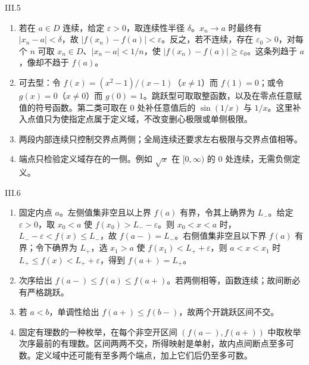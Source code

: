\begin{solution}{III.5}
\begin{enumerate}
 \item 若在 \(a\in D\) 连续，给定 \(\varepsilon>0\)，取连续性半径 \(\delta\)。\(x_n\to a\) 时最终有 \(|x_n-a|<\delta\)，故 \(|f(x_n)-f(a)|<\varepsilon\)。反之，若不连续，存在 \(\varepsilon_0>0\)，对每个 \(n\) 可取 \(x_n\in D\)、\(|x_n-a|<1/n\)，使 \(|f(x_n)-f(a)|\ge\varepsilon_0\)。这条列趋于 \(a\)，像却不趋于 \(f(a)\)。
 \item 可去型：令 \(f(x)=(x^2-1)/(x-1)\)（\(x\ne1\)）而 \(f(1)=0\)；或令 \(g(x)=0\)（\(x\ne0\)）而 \(g(0)=1\)。跳跃型可取取整函数，以及在零点任意赋值的符号函数。第二类可取在 \(0\) 处补任意值后的 \(\sin(1/x)\) 与 \(1/x\)。这里补入点值只为使指定点属于定义域，不改变删心极限或单侧极限。
 \item 两段内部连续只控制交界点两侧；全局连续还要求左右极限与交界点值相等。
 \item 端点只检验定义域存在的一侧。例如 \(\sqrt x\) 在 \([0,\infty)\) 的 \(0\) 处连续，无需负侧定义。
\end{enumerate}
\end{solution}

\begin{solution}{III.6}
\begin{enumerate}
 \item 固定内点 \(a\)。左侧值集非空且以上界 \(f(a)\) 有界，令其上确界为 \(L_-\)。给定 \(\varepsilon>0\)，取 \(x_0<a\) 使 \(f(x_0)>L_--\varepsilon\)。则 \(x_0<x<a\) 时，\(L_--\varepsilon<f(x)\le L_-\)，故 \(f(a-)=L_-\)。右侧值集非空且以下界 \(f(a)\) 有界；令下确界为 \(L_+\)，选 \(x_1>a\) 使 \(f(x_1)<L_++\varepsilon\)，则 \(a<x<x_1\) 时 \(L_+\le f(x)<L_++\varepsilon\)，得到 \(f(a+)=L_+\)。
 \item 次序给出 \(f(a-)\le f(a)\le f(a+)\)。若两侧相等，函数连续；故间断必有严格跳跃。
 \item 若 \(a<b\)，单调性给出 \(f(a+)\le f(b-)\)，故两个开跳跃区间不交。
 \item 固定有理数的一种枚举，在每个非空开区间 \((f(a-),f(a+))\) 中取枚举次序最前的有理数。区间两两不交，所得映射是单射，故内点间断点至多可数。定义域中还可能有至多两个端点，加上它们后仍至多可数。
\end{enumerate}
\end{solution}

